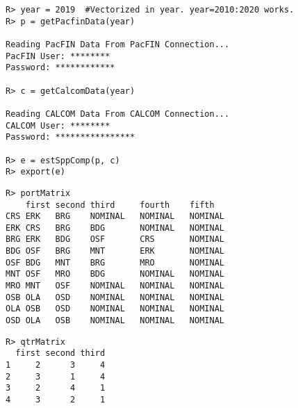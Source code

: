 \documentclass[ xcolor = pdftex, dvipsnames, table ]{beamer}
\begin{document}
%
\begin{frame}[fragile]
\begin{verbatim}
R> year = 2019	#Vectorized in year. year=2010:2020 works. 
R> p = getPacfinData(year)

Reading PacFIN Data From PacFIN Connection...
PacFIN User: ********
Password: ************

R> c = getCalcomData(year)

Reading CALCOM Data From CALCOM Connection...
CALCOM User: ********
Password: ****************

R> e = estSppComp(p, c)
R> export(e)
\end{verbatim}
\end{frame}

%
\begin{frame}[fragile]
\begin{minipage}[h!]{0.69\textwidth}
{\scriptsize
\begin{verbatim}
R> portMatrix
    first second third     fourth    fifth    
CRS ERK   BRG    NOMINAL   NOMINAL   NOMINAL
ERK CRS   BRG    BDG       NOMINAL   NOMINAL
BRG ERK   BDG    OSF       CRS       NOMINAL
BDG OSF   BRG    MNT       ERK       NOMINAL
OSF BDG   MNT    BRG       MRO       NOMINAL
MNT OSF   MRO    BDG       NOMINAL   NOMINAL
MRO MNT   OSF    NOMINAL   NOMINAL   NOMINAL
OSB OLA   OSD    NOMINAL   NOMINAL   NOMINAL
OLA OSB   OSD    NOMINAL   NOMINAL   NOMINAL
OSD OLA   OSB    NOMINAL   NOMINAL   NOMINAL
\end{verbatim}
}
\end{minipage}
\begin{minipage}[h!]{0.29\textwidth}
{\scriptsize
\begin{verbatim}
R> qtrMatrix
  first second third
1     2      3     4
2     3      1     4
3     2      4     1
4     3      2     1






\end{verbatim}
}
\end{minipage}

\end{frame}

%
\end{document}
